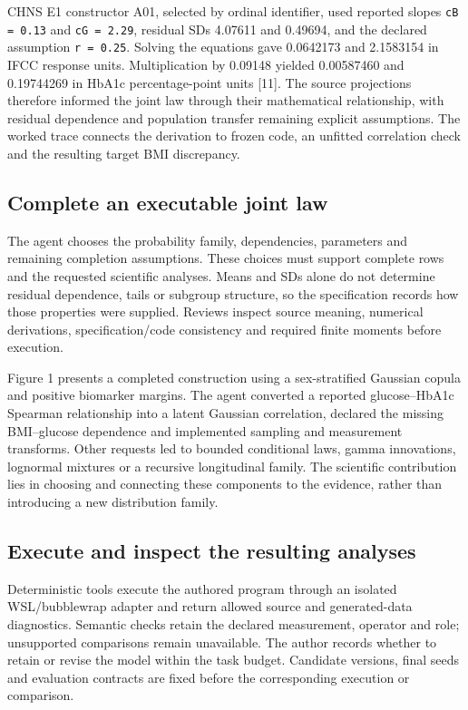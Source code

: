 \documentclass[sigconf,anonymous,review]{acmart}
\begin{document}
CHNS E1 constructor A01, selected by ordinal identifier, used reported slopes \texttt{cB = 0.13} and \texttt{cG = 2.29}, residual SDs 4.07611 and 0.49694, and the declared assumption \texttt{r = 0.25}. Solving the equations gave 0.0642173 and 2.1583154 in IFCC response units. Multiplication by 0.09148 yielded 0.00587460 and 0.19744269 in HbA1c percentage-point units [11]. The source projections therefore informed the joint law through their mathematical relationship, with residual dependence and population transfer remaining explicit assumptions. The worked trace connects the derivation to frozen code, an unfitted correlation check and the resulting target BMI discrepancy.


\subsection{Complete an executable joint law}

The agent chooses the probability family, dependencies, parameters and remaining completion assumptions. These choices must support complete rows and the requested scientific analyses. Means and SDs alone do not determine residual dependence, tails or subgroup structure, so the specification records how those properties were supplied. Reviews inspect source meaning, numerical derivations, specification/\allowbreak{}code consistency and required finite moments before execution.


Figure 1 presents a completed construction using a sex-stratified Gaussian copula and positive biomarker margins. The agent converted a reported glucose–\allowbreak{}HbA1c Spearman relationship into a latent Gaussian correlation, declared the missing BMI–\allowbreak{}glucose dependence and implemented sampling and measurement transforms. Other requests led to bounded conditional laws, gamma innovations, lognormal mixtures or a recursive longitudinal family. The scientific contribution lies in choosing and connecting these components to the evidence, rather than introducing a new distribution family.


\subsection{Execute and inspect the resulting analyses}

Deterministic tools execute the authored program through an isolated WSL/\allowbreak{}bubblewrap adapter and return allowed source and generated-data diagnostics. Semantic checks retain the declared measurement, operator and role; unsupported comparisons remain unavailable. The author records whether to retain or revise the model within the task budget. Candidate versions, final seeds and evaluation contracts are fixed before the corresponding execution or comparison.
\end{document}
